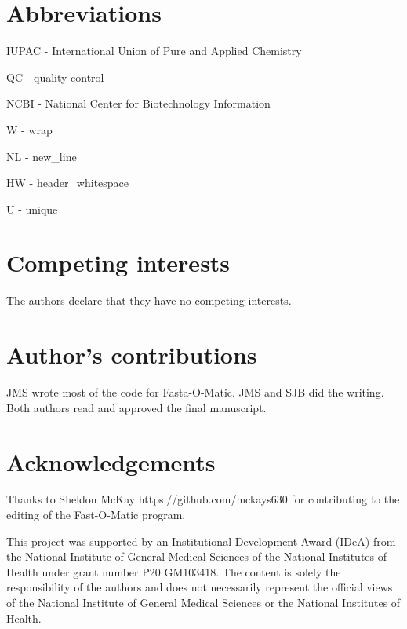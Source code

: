 \documentclass{bmcart}
\begin{document}

\begin{backmatter}

\section*{Abbreviations}

IUPAC - International Union of Pure and Applied Chemistry

QC - quality control

NCBI - National Center for Biotechnology Information

W - wrap

NL - new\_line

HW - header\_whitespace

U - unique

\section*{Competing interests}
  The authors declare that they have no competing interests.

\section*{Author's contributions}
JMS wrote most of the code for Fasta-O-Matic. JMS and SJB did the writing. Both authors read and approved the final manuscript.

\section*{Acknowledgements}
  Thanks to Sheldon McKay https://github.com/mckays630 for contributing to the editing of the Fast-O-Matic program.

This project was supported by an Institutional Development Award (IDeA) from the National Institute of General Medical Sciences of the National Institutes of Health under grant number P20 GM103418. The content is solely the responsibility of the authors and does not necessarily represent the official views of the National Institute of General Medical Sciences or the National Institutes of Health.




\end{backmatter}
\end{document}
